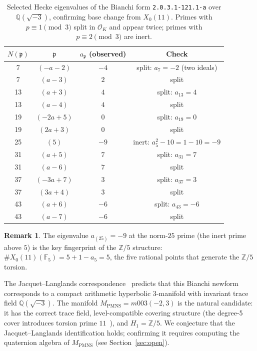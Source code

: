 \documentclass[11pt,a4paper]{article}
\theoremstyle{definition}
\newtheorem{remark}[theorem]{Remark}
\newcommand{\QQ}{\mathbb{Q}}
\newcommand{\ZZ}{\mathbb{Z}}
\newcommand{\MPMNS}{M_{\mathrm{PMNS}}}
\begin{document}
\begin{table}[htbp]
\centering
\caption{Selected Hecke eigenvalues of the Bianchi form
\texttt{2.0.3.1-121.1-a} over $\QQ(\sqrt{-3})$, confirming
base change from $X_0(11)$.
Primes with $p\equiv 1\pmod3$ split in $\mathcal{O}_K$ and
appear twice; primes with $p\equiv 2\pmod3$ are inert.}
\label{tab:bianchi}
\begin{tabular}{cccc}
\toprule
$N(\mathfrak{p})$ & $\mathfrak{p}$ & $a_{\mathfrak{p}}$ (observed)
  & Check \\
\midrule
7  & $(-a-2)$ & $-4$ & split: $a_7=-2$ (two ideals)\\
7  & $(a-3)$  & $2$ & split \\
13 & $(a+3)$  & $4$ & split: $a_{13}=4$ \\
13 & $(a-4)$  & $4$ & split \\
19 & $(-2a+5)$ & $0$ & split: $a_{19}=0$ \\
19 & $(2a+3)$ & $0$ & split \\
25 & $(5)$    & $-9$ & inert: $a_5^2-10=1-10=-9$ \\
31 & $(a+5)$  & $7$ & split: $a_{31}=7$ \\
31 & $(a-6)$  & $7$ & split \\
37 & $(-3a+7)$ & $3$ & split: $a_{37}=3$ \\
37 & $(3a+4)$ & $3$ & split \\
43 & $(a+6)$  & $-6$ & split: $a_{43}=-6$ \\
43 & $(a-7)$  & $-6$ & split \\
\bottomrule
\end{tabular}
\end{table}

\begin{remark}
The eigenvalue $a_{(25)}=-9$ at the norm-$25$ prime (the inert prime
above $5$) is the key fingerprint of the $\ZZ/5$ structure:
$\#X_0(11)(\mathbb{F}_5) = 5+1-a_5 = 5$, the five rational points
that generate the $\ZZ/5$ torsion.
\end{remark}

The Jacquet--Langlands correspondence~\cite{JacquetLanglands}
predicts that this Bianchi newform corresponds to a compact arithmetic
hyperbolic 3-manifold with invariant trace field $\QQ(\sqrt{-3})$.
The manifold $\MPMNS = m003(-2,3)$ is the natural candidate:
it has the correct trace field, level-compatible covering structure
(the degree-5 cover introduces torsion prime $11$~\cite{Gentry:FareyTower}),
and $H_1 = \ZZ/5$.
We conjecture that the Jacquet--Langlands identification holds;
confirming it requires computing the quaternion algebra of $\MPMNS$
(see Section~\ref{sec:open}).
\end{document}
